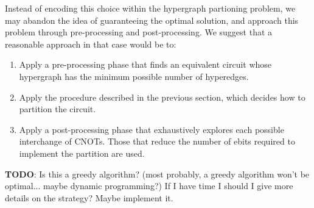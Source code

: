 Instead of encoding this choice within the hypergraph partioning problem, we may abandon the idea of guaranteeing the optimal solution, and approach this problem through pre-processing and post-processing. We suggest that a reasonable approach in that case would be to:
\begin{enumerate} 
\item Apply a pre-processing phase that finds an equivalent circuit whose hypergraph has the minimum possible number of hyperedges. 
\item Apply the procedure described in the previous section, which decides how to partition the circuit. 
\item Apply a post-processing phase that exhaustively explores each possible interchange of CNOTs. Those that reduce the number of ebits required to implement the partition are used.
\end{enumerate}

\textbf{TODO}: Is this a greedy algorithm? (most probably, a greedy algorithm won't be optimal... maybe dynamic programming?) If I have time I should I give more details on the strategy? Maybe implement it.
